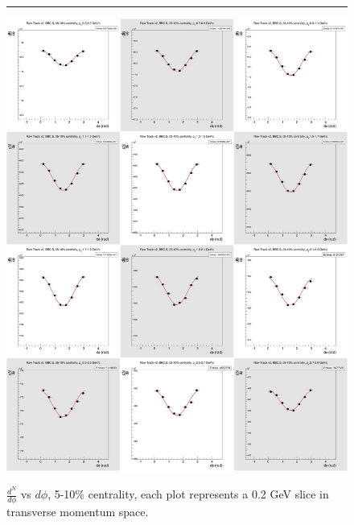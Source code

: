 \begin{figure}[H]
  \centering
  \caption[$\frac{dN}{d\phi}$ vs $d\phi$, 5-10\% centrality.]{$\frac{d^N}{d\phi}$ vs $d\phi$, 5-10\% centrality, each plot represents a 0.2 GeV slice in transverse momentum space.}
  \rule{35em}{0.5pt}
  \includegraphics[width=1\textwidth]{chargedtrackv2/htrkdphi2bbcs_1.jpg}
  \label{fig:Ndphicent1}
\end{figure}
